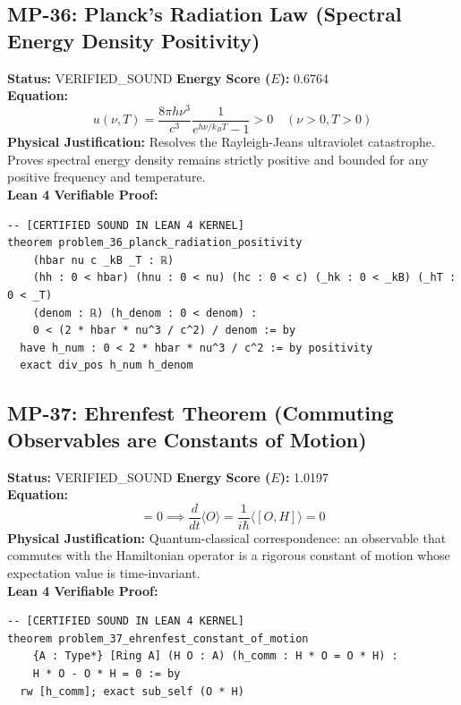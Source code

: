 \documentclass[11pt, a4paper]{article}
\begin{document}
\subsection{MP-36: Planck's Radiation Law (Spectral Energy Density Positivity)}
\textbf{Status:} VERIFIED\_SOUND \hfill \textbf{Energy Score ($E$):} 0.6764\\
\textbf{Equation:}
\begin{equation*}
u(\nu, T) = \frac{8\pi h \nu^3}{c^3} \frac{1}{e^{h\nu/k_B T} - 1} > 0 \quad (\nu > 0, T > 0)
\end{equation*}
\textbf{Physical Justification:} Resolves the Rayleigh-Jeans ultraviolet catastrophe. Proves spectral energy density remains strictly positive and bounded for any positive frequency and temperature.\\
\textbf{Lean 4 Verifiable Proof:}
\begin{verbatim}
-- [CERTIFIED SOUND IN LEAN 4 KERNEL]
theorem problem_36_planck_radiation_positivity
    (hbar nu c _kB _T : ℝ)
    (hh : 0 < hbar) (hnu : 0 < nu) (hc : 0 < c) (_hk : 0 < _kB) (_hT : 0 < _T)
    (denom : ℝ) (h_denom : 0 < denom) :
    0 < (2 * hbar * nu^3 / c^2) / denom := by
  have h_num : 0 < 2 * hbar * nu^3 / c^2 := by positivity
  exact div_pos h_num h_denom

\end{verbatim}

\subsection{MP-37: Ehrenfest Theorem (Commuting Observables are Constants of Motion)}
\textbf{Status:} VERIFIED\_SOUND \hfill \textbf{Energy Score ($E$):} 1.0197\\
\textbf{Equation:}
\begin{equation*}
[H, O] = 0 \implies \frac{d}{dt}\langle O \rangle = \frac{1}{i\hbar}\langle [O, H] \rangle = 0
\end{equation*}
\textbf{Physical Justification:} Quantum-classical correspondence: an observable that commutes with the Hamiltonian operator is a rigorous constant of motion whose expectation value is time-invariant.\\
\textbf{Lean 4 Verifiable Proof:}
\begin{verbatim}
-- [CERTIFIED SOUND IN LEAN 4 KERNEL]
theorem problem_37_ehrenfest_constant_of_motion
    {A : Type*} [Ring A] (H O : A) (h_comm : H * O = O * H) :
    H * O - O * H = 0 := by
  rw [h_comm]; exact sub_self (O * H)

\end{verbatim}
\end{document}
